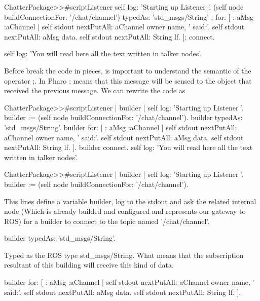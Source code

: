 \documentclass[a4paper,10pt,twoside]{book}
\begin{document}
			\begin{code}
			ChatterPackage>>#scriptListener
				self log: 'Starting up Listener '.
				(self node buildConnectionFor:  '/chat/channel') 
						typedAs: 'std_msgs/String' ; 
						for: [ : aMsg :aChannel | 
							self stdout nextPutAll: aChannel owner name, ' said:'.
							self stdout  nextPutAll: aMsg data.
							self stdout  nextPutAll: String lf.
				 		];
						connect.
				
				self log: 'You will read here all the text written in talker nodes'.
			\end{code}
			
			
			Before break the code in pieces, is important to understand the semantic of the operator ;. In Pharo ; means that this message will be sensed to the object that received the previous message. We can rewrite the code as 
			
			\begin{code}
			ChatterPackage>>#scriptListener
				| builder |
				self log: 'Starting up Listener '.
				builder := (self node buildConnectionFor:  '/chat/channel'). 
				builder typedAs: 'std_msgs/String'. 
				builder for: [ : aMsg :aChannel | 
							self stdout nextPutAll: aChannel owner name, ' said:'.
							self stdout  nextPutAll: aMsg data.
							self stdout  nextPutAll: String lf.
				 		].
				builder connect.
				self log: 'You will read here all the text written in talker nodes'.
			\end{code}
			
			
			\begin{code}
			ChatterPackage>>#scriptListener
				| builder |
				self log: 'Starting up Listener '.
				builder := (self node buildConnectionFor:  '/chat/channel'). 
			\end{code}
				This lines define a variable builder, log to the stdout and ask the related internal node (Which is already builded and configured and represents our gateway to ROS) for a builder to connect to the topic named '/chat/channel'.
			
			\begin{code}
				builder typedAs: 'std_msgs/String'. 
			\end{code}
				
				Typed as the ROS type std\_msgs/String. What means that the subscription resultant of this building will receive this kind of data.
				
				
			\begin{code}
				builder for: [ : aMsg :aChannel | 
							self stdout nextPutAll: aChannel owner name, ' said:'.
							self stdout  nextPutAll: aMsg data.
							self stdout  nextPutAll: String lf.
				 		].
			\end{code}
			
\end{document}
